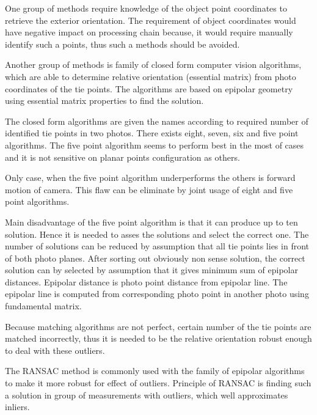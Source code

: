 \documentclass[a4paper,12pt]{article}
\begin{document}
One group of methods require knowledge of the object point coordinates to retrieve the exterior
orientation. 
The requirement of object coordinates would have negative impact on processing 
chain because, it would require manually identify such a points, thus 
such a methods should be avoided. 


Another group of methods is family of closed form computer vision algorithms,
which are able to determine relative orientation (essential matrix) from photo coordinates 
of the tie points. The algorithms are based on epipolar geometry using essential matrix 
properties to find the solution. 


The closed form algorithms are given the names 
according to required number of identified tie points in two photos.
There exists eight, seven, six and five point algorithms. The five point algorithm seems to perform best in the most
of cases \cite{stewenius2006recent} and it is not sensitive on planar points configuration as others.

Only case, when the five point algorithm \cite{nister2004efficient} underperforms 
\cite{bruckner2008experimental} the others is forward motion of camera.
This flaw can be eliminate by  joint usage of eight and five point algorithms.

Main disadvantage of the five point algorithm is that it can produce up to ten solution.
Hence it is needed to asses the solutions and select the correct one. The number of solutions
can be reduced by assumption that all tie points lies in front of both photo 
planes. After sorting out obviously non sense solution,
 the correct solution can by selected by assumption that it gives minimum sum of epipolar distances.
 Epipolar distance is photo point distance
 from epipolar line. The epipolar line is computed from corresponding photo point 
 in another photo using fundamental matrix.
  
Because matching algorithms are not perfect, certain number of the tie points are matched 
incorrectly, thus it is needed to be the relative orientation robust enough to
deal with these outliers.

The RANSAC \cite{wiki:RANSAC} method is commonly used with the family of epipolar algorithms to 
make it more robust for effect of outliers.
Principle of RANSAC is finding such  a solution in group of measurements with outliers, 
which well approximates inliers.  
\end{document}

